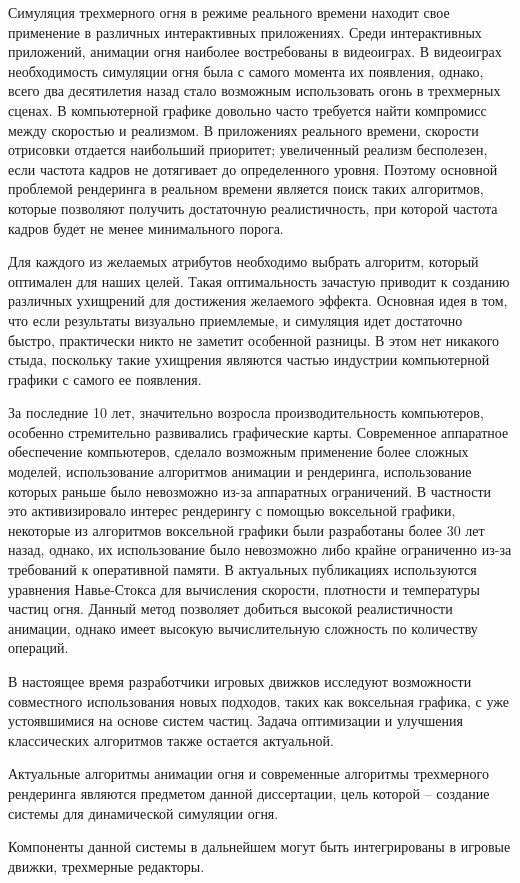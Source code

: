 Симуляция трехмерного огня в режиме реального времени находит свое применение в
различных интерактивных приложениях.  Среди интерактивных приложений, анимации
огня наиболее востребованы в видеоиграх. В видеоиграх необходимость симуляции
огня была с самого момента их появления, однако, всего два десятилетия назад
стало возможным использовать огонь в трехмерных сценах.  В компьютерной графике
довольно часто требуется найти компромисс между скоростью и реализмом. В
приложениях реального времени, скорости отрисовки отдается наибольший приоритет;
увеличенный реализм бесполезен, если частота кадров не дотягивает до
определенного уровня. Поэтому основной проблемой рендеринга в реальном времени
является поиск таких алгоритмов, которые позволяют получить достаточную
реалистичность, при которой частота кадров будет не менее минимального порога.

Для каждого из желаемых атрибутов необходимо выбрать алгоритм, который оптимален
для наших целей. Такая оптимальность зачастую приводит к созданию различных
ухищрений для достижения желаемого эффекта. Основная идея в том, что если
результаты визуально приемлемые, и симуляция идет достаточно быстро, практически
никто не заметит особенной разницы. В этом нет никакого стыда, поскольку такие
ухищрения являются частью индустрии компьютерной графики с самого ее появления.

За последние 10 лет, значительно возросла производительность компьютеров,
особенно стремительно развивались графические карты. Современное аппаратное
обеспечение компьютеров, сделало возможным применение более сложных моделей,
использование алгоритмов анимации и рендеринга, использование которых раньше
было невозможно из-за аппаратных ограничений. В частности это активизировало
интерес рендерингу с помощью воксельной графики, некоторые из алгоритмов
воксельной графики были разработаны более 30 лет назад, однако, их использование
было невозможно либо крайне ограниченно из-за требований к оперативной памяти. В
актуальных публикациях используются уравнения Навье-Стокса для вычисления
скорости, плотности и температуры частиц огня.  Данный метод позволяет добиться
высокой реалистичности анимации, однако имеет высокую вычислительную сложность
по количеству операций.

В настоящее время разработчики игровых движков исследуют возможности
совместного использования новых подходов, таких как воксельная графика, с уже
устоявшимися на основе систем частиц. Задача оптимизации и улучшения
классических алгоритмов также остается актуальной.

Актуальные алгоритмы анимации огня и современные алгоритмы трехмерного
рендеринга являются предметом данной диссертации, цель которой -- создание
системы для динамической симуляции огня.

Компоненты данной системы в дальнейшем могут быть интегрированы в игровые
движки, трехмерные редакторы.
